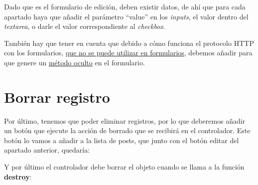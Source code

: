 Dado que es el formulario de edición, deben existir datos, de ahí que para cada apartado haya que añadir el parámetro “value” en los \textit{inputs}, el valor dentro del \textit{textarea}, o darle el valor correspondiente al \textit{checkbox}.

También hay que tener en cuenta que debido a cómo funciona el protocolo HTTP con los formularios, \href{https://developer.mozilla.org/en-US/docs/Web/HTTP/Methods/PUT}{que no se puede utilizar en formularios}, debemos añadir  para que genere un \href{https://laravel.com/docs/10.x/blade#method-field}{método oculto} en el formulario.



\chapter{Borrar registro}

Por último, tenemos que poder eliminar registros, por lo que deberemos añadir un botón que ejecute la acción de borrado que se recibirá en el controlador.
Este botón lo vamos a añadir a la lista de posts, que junto con el botón editar del apartado anterior, quedaría:


Y por último el controlador debe borrar el objeto cuando se llama a la función \textbf{destroy}:

